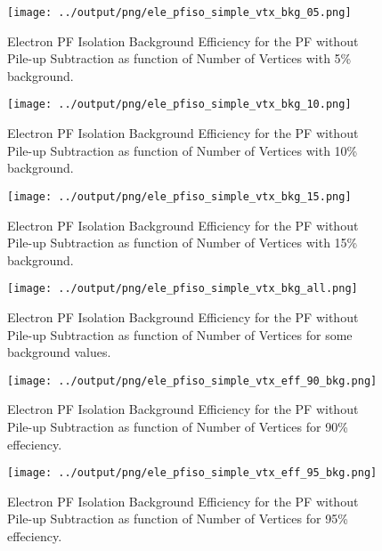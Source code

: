 \documentclass[11pt]{book}
\begin{document}
\begin{figure}[htb]
\centering
\texttt{[image: ../output/png/ele\_pfiso\_simple\_vtx\_bkg\_05.png]}
\caption{Electron PF Isolation Background Efficiency for the PF without Pile-up Subtraction as function of Number of Vertices with 5\% background.}
\label{fig:ele_pfiso_vtx_bkg_simple_bkg_05}
\end{figure}

\begin{figure}[htb]
\centering
\texttt{[image: ../output/png/ele\_pfiso\_simple\_vtx\_bkg\_10.png]}
\caption{Electron PF Isolation Background Efficiency for the PF without Pile-up Subtraction as function of Number of Vertices with 10\% background.}
\label{fig:ele_pfiso_vtx_bkg_simple_bkg_10}
\end{figure}

\begin{figure}[htb]
\centering
\texttt{[image: ../output/png/ele\_pfiso\_simple\_vtx\_bkg\_15.png]}
\caption{Electron PF Isolation Background Efficiency for the PF without Pile-up Subtraction as function of Number of Vertices with 15\% background.}
\label{fig:ele_pfiso_vtx_bkg_simple_bkg_15}
\end{figure}

\begin{figure}[htb]
\centering
\texttt{[image: ../output/png/ele\_pfiso\_simple\_vtx\_bkg\_all.png]}
\caption{Electron PF Isolation Background Efficiency for the PF without Pile-up Subtraction as function of Number of Vertices for some background values.}
\label{fig:ele_pfiso_vtx_bkg_simple_bkg_all}
\end{figure}

\begin{figure}[htb]
\centering
\texttt{[image: ../output/png/ele\_pfiso\_simple\_vtx\_eff\_90\_bkg.png]}
\caption{Electron PF Isolation Background Efficiency for the PF without Pile-up Subtraction as function of Number of Vertices for 90\% effeciency.}
\label{fig:ele_pfiso_vtx_eff_simple_eff_90_bkg}
\end{figure}

\begin{figure}[htb]
\centering
\texttt{[image: ../output/png/ele\_pfiso\_simple\_vtx\_eff\_95\_bkg.png]}
\caption{Electron PF Isolation Background Efficiency for the PF without Pile-up Subtraction as function of Number of Vertices for 95\% effeciency.}
\label{fig:ele_pfiso_vtx_eff_simple_eff_95_bkg}
\end{figure}
\end{document}
